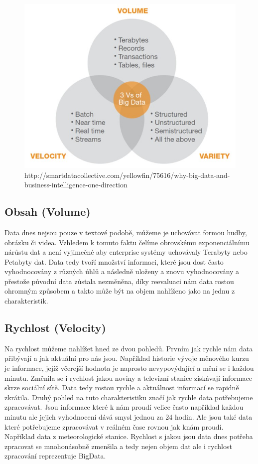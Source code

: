 \begin{figure}[h]
\centering
\includegraphics[scale=0.6]{images/3v}
\caption{http://smartdatacollective.com/yellowfin/75616/why-big-data-and-business-intelligence-one-direction}
\label{fig:3v}

\end{figure}

\subsection[3v-volume]{Obsah (Volume)}
Data dnes nejsou pouze v textové podobě, můžeme je uchovávat formou hudby, obrázku či videa. Vzhledem k tomuto faktu čelíme obrovskému exponenciálnímu nárůstu dat a není vyjimečné aby enterprise systémy uchovávaly Terabyty nebo Petabyty dat. Data tedy tvoří množství informaci, které jsou dost často vyhodnocovány z různých úhlů a následně uloženy a znovu vyhodnocovány a přestože původní data zůstala nezměněna, díky reevaluaci nám data rostou ohromným způsobem a takto může být na objem nahlíženo jako na jednu z charakteristik.

\subsection{Rychlost (Velocity)}
Na rychlost můžeme nahlížet hned ze dvou pohledů. Prvním jak rychle nám data přibývají a jak aktuální pro nás jsou. Například historie vývoje měnového kurzu je informace, jejíž včerejší hodnota je naprosto nevypovýdající a mění se i každou minutu. Změnila se i rychlost jakou noviny a televizní stanice získávají informace skrze sociální sítě. Data tedy rostou rychle a aktuálnost informací se rapidně zkrátila. Druhý pohled na tuto charakteristiku značí jak rychle data potřebujeme zpracovávat. Jsou informace které k nám proudí velice často například každou minutu ale jejich vyhodnocení dává smysl jednou za 24 hodin. Ale jsou také data které potřebujeme zpracovávat v reálném čase rovnou jak knám proudí. Například data z meteorologické stanice. 
Rychlost s jakou jsou data dnes potřeba zpracovat se mnohonásobně zmenšila a tedy nejen objem dat ale i rychlost zpracování reprezentuje BigData.

